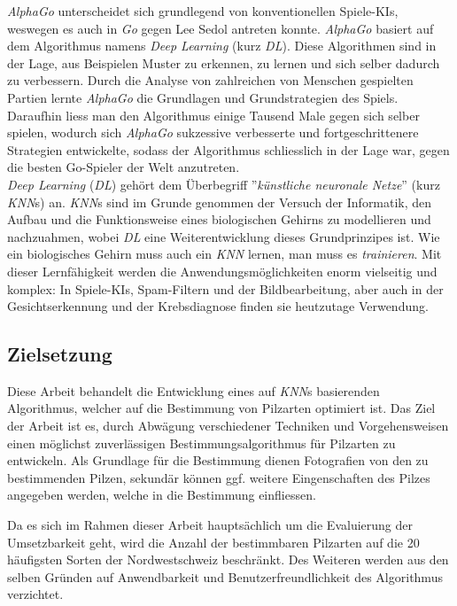 \vspace{0.5cm}

\textit{AlphaGo} unterscheidet sich grundlegend von konventionellen Spiele-KIs, weswegen es auch in \textit{Go} gegen Lee Sedol antreten konnte. \textit{AlphaGo} basiert auf dem Algorithmus namens \textit{Deep Learning} (kurz \textit{DL}). Diese Algorithmen sind in der Lage, aus Beispielen Muster zu erkennen, zu lernen und sich selber dadurch zu verbessern. Durch die Analyse von zahlreichen von Menschen gespielten Partien lernte \textit{AlphaGo} die Grundlagen und Grundstrategien des Spiels. Daraufhin liess man den Algorithmus einige Tausend Male gegen sich selber spielen, wodurch sich \textit{AlphaGo} sukzessive verbesserte und fortgeschrittenere Strategien entwickelte, sodass der Algorithmus schliesslich in der Lage war, gegen die besten Go-Spieler der Welt anzutreten.\\

\textit{Deep Learning} (\textit{DL}) gehört dem Überbegriff ''\textit{künstliche neuronale Netze}'' (kurz \textit{KNN}s) an. \textit{KNN}s sind im Grunde genommen der Versuch der Informatik, den Aufbau und die Funktionsweise eines biologischen Gehirns zu modellieren und nachzuahmen, wobei \textit{DL} eine Weiterentwicklung dieses Grundprinzipes ist. Wie ein biologisches Gehirn muss auch ein \textit{KNN} lernen, man muss es \textit{trainieren}. Mit dieser Lernfähigkeit werden die Anwendungsmöglichkeiten enorm vielseitig und komplex: In Spiele-KIs, Spam-Filtern und der Bildbearbeitung, aber auch in der Gesichtserkennung und der Krebsdiagnose finden sie heutzutage Verwendung. 

\subsection{Zielsetzung}

Diese Arbeit behandelt die Entwicklung eines auf \textit{KNN}s basierenden Algorithmus, welcher auf die Bestimmung von Pilzarten optimiert ist. Das Ziel der Arbeit ist es, durch Abwägung verschiedener Techniken und Vorgehensweisen einen möglichst zuverlässigen Bestimmungsalgorithmus für Pilzarten zu entwickeln. Als Grundlage für die Bestimmung dienen Fotografien von den zu bestimmenden Pilzen, sekundär können ggf. weitere Eingenschaften des Pilzes angegeben werden, welche in die Bestimmung einfliessen.

Da es sich im Rahmen dieser Arbeit hauptsächlich um die Evaluierung der Umsetzbarkeit geht, wird die Anzahl der bestimmbaren Pilzarten auf die 20 häufigsten Sorten der Nordwestschweiz beschränkt. Des Weiteren werden aus den selben Gründen auf Anwendbarkeit und Benutzerfreundlichkeit des Algorithmus verzichtet.

